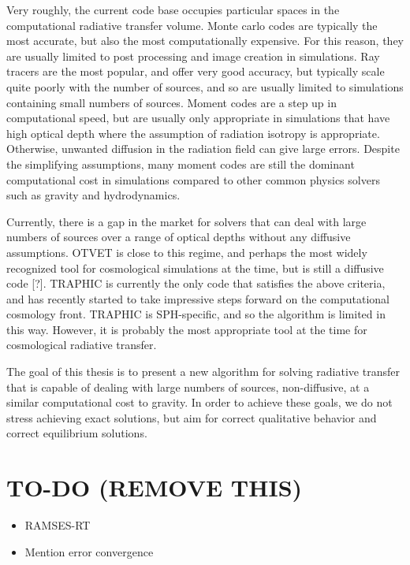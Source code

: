 Very roughly, the current code base occupies particular spaces in the computational radiative transfer volume. Monte carlo codes are typically the most accurate, but also the most computationally expensive. For this reason, they are usually limited to post processing and image creation in simulations. Ray tracers are the most popular, and offer very good accuracy, but typically scale quite poorly with the number of sources, and so are usually limited to simulations containing small numbers of sources. Moment codes are a step up in computational speed, but are usually only appropriate in simulations that have high optical depth where the assumption of radiation isotropy is appropriate. Otherwise, unwanted diffusion in the radiation field can give large errors. Despite the simplifying assumptions, many moment codes are still the dominant computational cost in simulations compared to other common physics solvers such as gravity and hydrodynamics.

Currently, there is a gap in the market for solvers that can deal with large numbers of sources over a range of optical depths without any diffusive assumptions. OTVET \citep{gnedinAbel01} is close to this regime, and perhaps the most widely recognized tool for cosmological simulations at the time, but is still a diffusive code [?]. TRAPHIC is currently the only code that satisfies the above criteria, and has recently started to take impressive steps forward on the computational cosmology front. TRAPHIC is SPH-specific, and so the algorithm is limited in this way. However, it is probably the most appropriate tool at the time for cosmological radiative transfer.


The goal of this thesis is to present a new algorithm for solving radiative transfer that is capable of dealing with large numbers of sources, non-diffusive, at a similar computational cost to gravity. In order to achieve these goals, we do not stress achieving exact solutions, but aim for correct qualitative behavior and correct equilibrium solutions.

\section{TO-DO (REMOVE THIS)}

\begin{itemize}
\item RAMSES-RT \citep{rosDahlTeyssier15,rosdahlEt13}
\item Mention error convergence
\end{itemize}


